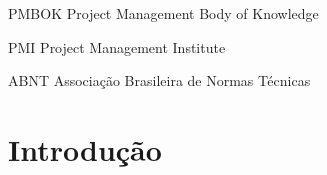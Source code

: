 \documentclass[
    12pt,               %
    openright,          %
    twoside,            %
    a4paper,            %
    chapter=TITLE,     %
    english,            %
    spanish,            %
    portuguese              %
    ]{abntex2}
\begin{document}















  \listoffigures*
  \cleardoublepage



  \listoftables*
  \cleardoublepage



\begin{siglas}
	\item[PMBOK] Project Management Body of Knowledge
	\item[PMI] Project Management Institute
	\item[ABNT] Associação Brasileira de Normas Técnicas
\end{siglas}


\tableofcontents

\textual


\chapter{Introdução}
\end{document}
